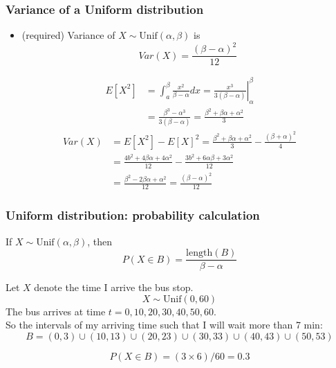 \documentclass[slidestop,compress,mathserif]{beamer}
\begin{document}

\begin{frame}\frametitle{Variance of a Uniform distribution}
\begin{itemize}
\item ({\color{red}required})  Variance of $X\sim \text{Unif}(\alpha, \beta)$ is
\[ Var(X)   = \frac{(\beta - \alpha)^2}{12} \]
\end{itemize}

\pause
\vspace{-0.7cm}
\begin{align*}
E[X^2] &= \int_a^\beta \frac{x^2}{\beta-\alpha} dx
        = \left. \frac{x^3}{3(\beta-\alpha)} \right|_\alpha^\beta \\
       &= \frac{\beta^3-\alpha^3}{3(\beta-\alpha)} = \frac{\beta^2+\beta \alpha+\alpha^2}{3}
\end{align*}
\pause
\begin{align*}
Var(X) &= E[X^2]-E[X]^2 = \frac{\beta^2+\beta \alpha+\alpha^2}{3} - \frac{(\beta+\alpha)^2}{4} \\
       &= \frac{4b^2+4 \beta \alpha+4 \alpha^2}{12} - \frac{3b^2+6 \alpha \beta+3 \alpha^2}{12} \\
       & = \frac{\beta^2-2 \beta \alpha +\alpha^2}{12}
        = \frac{(\beta-\alpha)^2}{12}
\end{align*}



\end{frame}

\begin{frame}\frametitle{Uniform distribution: probability calculation}

If $X \sim \text{Unif}(\alpha, \beta)$, then
\vspace{-0.8cm}
\[
P(X \in B) = \frac{\text{length}(B)}{\beta - \alpha}
\]

\pause
{}

\pause
Let $X$ denote the time I arrive the bus stop.
\[ X \sim \text{Unif}(0, 60) \]
\pause
The bus arrives at time $t = 0, 10, 20, 30, 40, 50, 60$.\\
So the intervals of my arriving time such that I will wait more than 7 min:
\[
B = (0, 3) \cup (10, 13)  \cup (20, 23) \cup (30, 33) \cup (40, 43) \cup (50, 53)
\]

\pause
\[
P(X \in B)  = (3 \times 6) / 60 = 0.3
\]


\end{frame}
\end{document}
